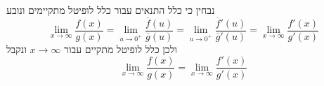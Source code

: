 \Subquestion{}
נבחין כי כלל התנאים עבור כלל לופיטל מתקיימים ונובע
\[
	\lim_{x \to \infty} \frac{f(x)}{g(x)}
	= \lim_{u \to 0^+} \frac{\overline{f}(u)}{\overline{g}(u)}
	= \lim_{u \to 0^+} \frac{\overline{f}'(u)}{\overline{g}'(u)}
	= \lim_{x \to \infty} \frac{f'(x)}{g'(x)}
\]
ולכן כלל לופיטל מתקיים עבור $x \to \infty$ ונקבל
\[
	\lim_{x \to \infty} \frac{f(x)}{g(x)}
	= \lim_{x \to \infty} \frac{f'(x)}{g'(x)}
\]


